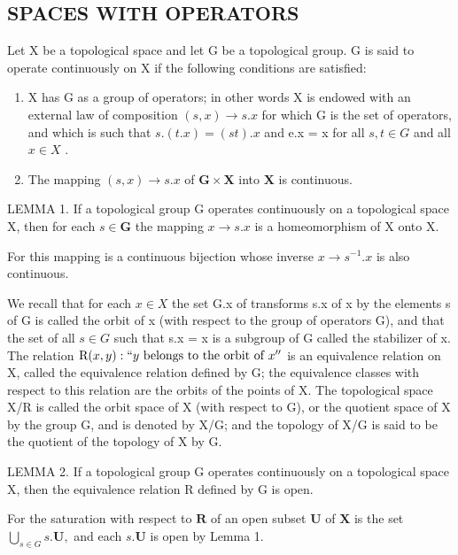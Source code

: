 \subsection{SPACES WITH OPERATORS}

Let X be a topological space and let G be a topological group. G is said to operate continuously on X if the following conditions are satisfied:

\begin{enumerate}
\def\labelenumi{\arabic{enumi})}
\item
  X has G as a group of operators; in other words X is endowed with an external law of composition \((s, x) \to s.x\) for which G is the set of operators, and which is such that \(s.(t.x) = (st).x\) and e.x = x for all \(s, t \in G\) and all \(x \in X\) .
\item
  The mapping \((s, x) \to s.x\) of \(\mathbf{G} \times \mathbf{X}\) into \(\mathbf{X}\) is continuous.
\end{enumerate}

LEMMA 1. If a topological group G operates continuously on a topological space X, then for each \(s \in \mathbf{G}\) the mapping \(x \to s.x\) is a homeomorphism of X onto X.

For this mapping is a continuous bijection whose inverse \(x \rightarrow s^{-1}.x\) is also continuous.

We recall that for each \(x \in X\) the set G.x of transforms s.x of x by the elements s of G is called the orbit of x (with respect to the group of operators G), and that the set of all \(s \in G\) such that s.x = x is a subgroup of G called the stabilizer of x. The relation \(\mathrm{R}(x, y) : ``y \text{ belongs to the orbit of } x''\) is an equivalence relation on X, called the equivalence relation defined by G; the equivalence classes with respect to this relation are the orbits of the points of X. The topological space X/R is called the orbit space of X (with respect to G), or the quotient space of X by the group G, and is denoted by X/G; and the topology of X/G is said to be the quotient of the topology of X by G.

LEMMA 2. If a topological group G operates continuously on a topological space X, then the equivalence relation R defined by G is open.

For the saturation with respect to \(\mathbf{R}\) of an open subset \(\mathbf{U}\) of \(\mathbf{X}\) is the set \(\bigcup_{s\in G}s.\mathbf{U},\) and each \(s.\mathbf{U}\) is open by Lemma 1.

